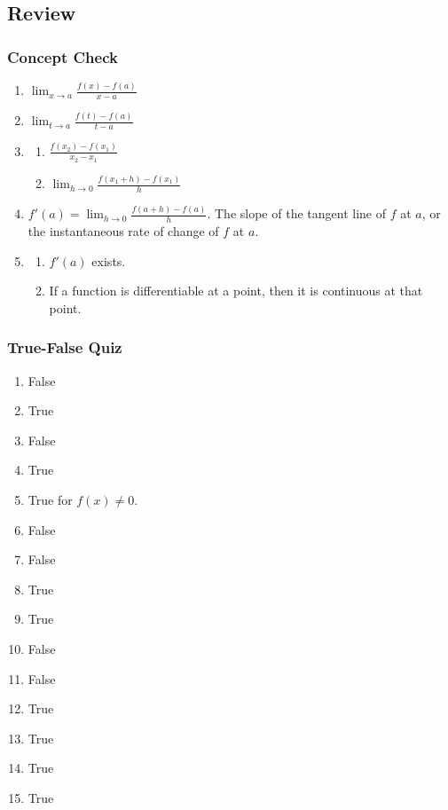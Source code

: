 \documentclass{article}
\begin{document}
\subsection*{Review}
\subsubsection*{Concept Check}
\begin{enumerate}
  \item $\lim_{x\to a}\frac{f(x)-f(a)}{x-a}$
  \item $\lim_{t\to a}\frac{f(t)-f(a)}{t-a}$
  \item
    \begin{enumerate}
      \item $\frac{f(x_2)-f(x_1)}{x_2-x_1}$
      \item $\lim_{h\to0}\frac{f(x_1+h)-f(x_1)}{h}$
    \end{enumerate}
  \item $f'(a)=\lim_{h\to0}\frac{f(a+h)-f(a)}{h}$. The slope of the tangent line of $f$ at $a$, or
    the instantaneous rate of change of $f$ at $a$.
  \item
    \begin{enumerate}
      \item $f'(a)$ exists.
      \item If a function is differentiable at a point, then it is continuous at that point.
    \end{enumerate}
\end{enumerate}

\subsubsection*{True-False Quiz}
\begin{enumerate}
  \item False
  \item True
  \item False
  \item True
  \item True for $f(x)\ne0$.
  \item False
  \item False
  \item True
  \item True
  \item False
  \item False
  \item True
  \item True
  \item True
  \item True
\end{enumerate}
\end{document}
